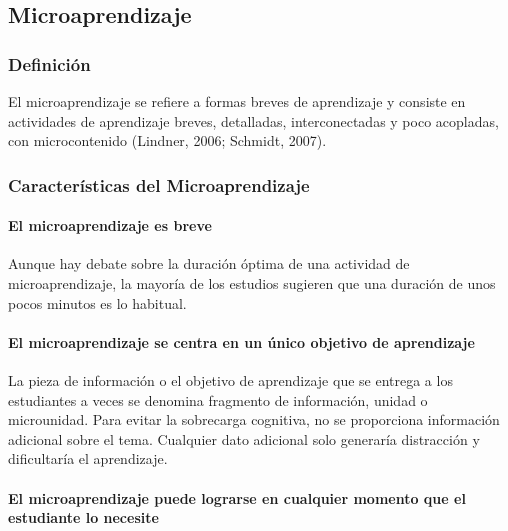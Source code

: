 
\subsection{Microaprendizaje}
\subsubsection{Definición}
El microaprendizaje se refiere a formas breves de aprendizaje y consiste en
actividades de aprendizaje breves, detalladas, interconectadas y poco acopladas,
con microcontenido (Lindner, 2006; Schmidt, 2007).
\cite{article:microlearning_buchem}

\subsubsection{Características del Microaprendizaje}
\paragraph{\textbf{El microaprendizaje es breve}}

Aunque hay debate sobre la duración óptima de una actividad de microaprendizaje,
la mayoría de los estudios sugieren que una duración de unos pocos minutos es lo
habitual.
\cite{article:when_i_say_microlearning}

\paragraph{\textbf{El microaprendizaje se centra en un único objetivo de aprendizaje}}
La pieza de información o el objetivo de aprendizaje que se entrega a los
estudiantes a veces se denomina fragmento de información, unidad o microunidad.
Para evitar la sobrecarga cognitiva, no se proporciona información adicional
sobre el tema. Cualquier dato adicional solo generaría distracción y
dificultaría el aprendizaje.
\cite{article:when_i_say_microlearning}

\paragraph{\textbf{El microaprendizaje puede lograrse en cualquier momento que
el estudiante lo necesite}}

